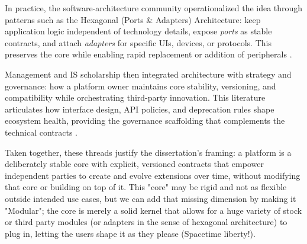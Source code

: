 In practice, the software-architecture community operationalized the idea through patterns such as the Hexagonal (Ports \& Adapters) Architecture: keep application logic independent of technology details, expose \emph{ports} as stable contracts, and attach \emph{adapters} for specific UIs, devices, or protocols. This preserves the core while enabling rapid replacement or addition of peripherals \cite{cockburn2005hexagonal}. 

Management and IS scholarship then integrated architecture with strategy and governance: how a platform owner maintains core stability, versioning, and compatibility while orchestrating third-party innovation. This literature articulates how interface design, API policies, and deprecation rules shape ecosystem health, providing the governance scaffolding that complements the technical contracts \cite{gawer2002platformleadership,tiwana2014platformecosystems}. 

Taken together, these threads justify the dissertation’s framing: a platform is a deliberately stable core with explicit, versioned contracts that empower independent parties to create and evolve extensions over time, without modifying that core or building on top of it. This "core" may be rigid and not as flexible outside intended use cases, but we can add that missing dimension by making it "Modular"; the core is merely a solid kernel that allows for a huge variety of stock or third party modules (or adapters in the sense of hexagonal architecture) to plug in, letting the users shape it as they please (Spacetime liberty!).

